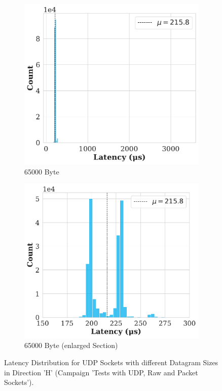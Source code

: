 \begin{figure}[h!]
  \begin{subfigure}[b]{0.45\linewidth}
    \includegraphics[width=\linewidth]{figures/performance/d_4c.pdf}
    \caption{65000 Byte}
    \label{fig:histFrag:c}
  \end{subfigure}
  \hfill
  \begin{subfigure}[b]{0.45\linewidth}
    \includegraphics[width=\linewidth]{figures/performance/d_4d.pdf}
    \caption{65000 Byte (enlarged Section)}
    \label{fig:histFrag:d}
  \end{subfigure}
  
  \caption{Latency Distribution for UDP Sockets with different Datagram Sizes in Direction 'H' (Campaign 'Tests with UDP, Raw and Packet Sockets').}
  \label{fig:histFrag}
\end{figure}

